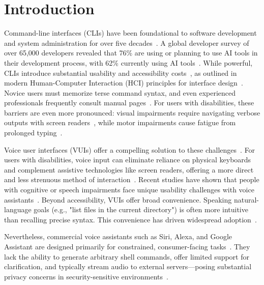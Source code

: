 \documentclass[a4paper,12pt]{article}
\begin{document}
\newpage
{}
\vspace*{-1.8cm}
\setlength{\parskip}{0pt}
\tableofcontents
\newpage
{}


\newpage
\section{Introduction}

\noindent
Command-line interfaces (CLIs) have been foundational to software development and system administration for over five decades~\cite{ref1}. A global developer survey of over 65,000 developers revealed that 76\% are using or planning to use AI tools in their development process, with 62\% currently using AI tools~\cite{ref2}. While powerful, CLIs introduce substantial usability and accessibility costs~\cite{ref3}, as outlined in modern Human-Computer Interaction (HCI) principles for interface design~\cite{ref10}. Novice users must memorize terse command syntax, and even experienced professionals frequently consult manual pages~\cite{ref1}. For users with disabilities, these barriers are even more pronounced: visual impairments require navigating verbose outputs with screen readers~\cite{ref3}, while motor impairments cause fatigue from prolonged typing~\cite{ref4}.

Voice user interfaces (VUIs) offer a compelling solution to these challenges~\cite{ref5}. For users with disabilities, voice input can eliminate reliance on physical keyboards and complement assistive technologies like screen readers, offering a more direct and less strenuous method of interaction~\cite{ref4}. Recent studies have shown that people with cognitive or speech impairments face unique usability challenges with voice assistants~\cite{ref28}. Beyond accessibility, VUIs offer broad convenience. Speaking natural-language goals (e.g., "list files in the current directory") is often more intuitive than recalling precise syntax. This convenience has driven widespread adoption~\cite{ref7}.

Nevertheless, commercial voice assistants such as Siri, Alexa, and Google Assistant are designed primarily for constrained, consumer-facing tasks~\cite{ref8}. They lack the ability to generate arbitrary shell commands, offer limited support for clarification, and typically stream audio to external servers—posing substantial privacy concerns in security-sensitive environments~\cite{ref7,ref9}.
\end{document}
